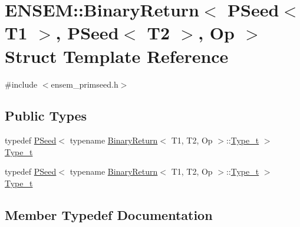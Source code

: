 \hypertarget{structENSEM_1_1BinaryReturn_3_01PSeed_3_01T1_01_4_00_01PSeed_3_01T2_01_4_00_01Op_01_4}{}\section{E\+N\+S\+EM\+:\+:Binary\+Return$<$ P\+Seed$<$ T1 $>$, P\+Seed$<$ T2 $>$, Op $>$ Struct Template Reference}
\label{structENSEM_1_1BinaryReturn_3_01PSeed_3_01T1_01_4_00_01PSeed_3_01T2_01_4_00_01Op_01_4}


{\ttfamily \#include $<$ensem\+\_\+primseed.\+h$>$}

\subsection*{Public Types}
\begin{DoxyCompactItemize}
\item 
typedef \mbox{\hyperlink{classENSEM_1_1PSeed}{P\+Seed}}$<$ typename \mbox{\hyperlink{structENSEM_1_1BinaryReturn}{Binary\+Return}}$<$ T1, T2, Op $>$\+::\mbox{\hyperlink{structENSEM_1_1BinaryReturn_3_01PSeed_3_01T1_01_4_00_01PSeed_3_01T2_01_4_00_01Op_01_4_ae3a30c4b21f95d0ccf2ef57c02e76dcb}{Type\+\_\+t}} $>$ \mbox{\hyperlink{structENSEM_1_1BinaryReturn_3_01PSeed_3_01T1_01_4_00_01PSeed_3_01T2_01_4_00_01Op_01_4_ae3a30c4b21f95d0ccf2ef57c02e76dcb}{Type\+\_\+t}}
\item 
typedef \mbox{\hyperlink{classENSEM_1_1PSeed}{P\+Seed}}$<$ typename \mbox{\hyperlink{structENSEM_1_1BinaryReturn}{Binary\+Return}}$<$ T1, T2, Op $>$\+::\mbox{\hyperlink{structENSEM_1_1BinaryReturn_3_01PSeed_3_01T1_01_4_00_01PSeed_3_01T2_01_4_00_01Op_01_4_ae3a30c4b21f95d0ccf2ef57c02e76dcb}{Type\+\_\+t}} $>$ \mbox{\hyperlink{structENSEM_1_1BinaryReturn_3_01PSeed_3_01T1_01_4_00_01PSeed_3_01T2_01_4_00_01Op_01_4_ae3a30c4b21f95d0ccf2ef57c02e76dcb}{Type\+\_\+t}}
\end{DoxyCompactItemize}


\subsection{Member Typedef Documentation}
\mbox{\label{structENSEM_1_1BinaryReturn_3_01PSeed_3_01T1_01_4_00_01PSeed_3_01T2_01_4_00_01Op_01_4_ae3a30c4b21f95d0ccf2ef57c02e76dcb}} 
